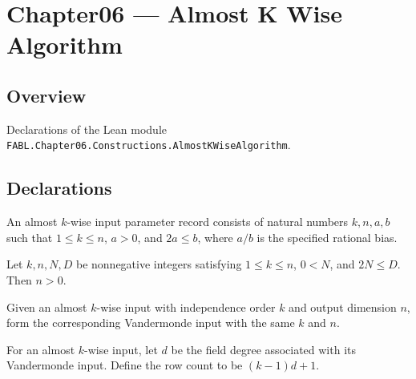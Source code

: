 \chapter{Chapter06 — Almost K Wise Algorithm}
\section{Overview}

Declarations of the Lean module \texttt{FABL.Chapter06.Constructions.AlmostKWiseAlgorithm}.

\section{Declarations}

\begin{definition}
\label{FABL.AlmostKWiseInput}
\leanok
An almost $k$-wise input parameter record consists of natural numbers $k,n,a,b$ such
that $1\le k\le n$, $a>0$, and $2a\le b$, where $a/b$ is the specified rational bias.
\end{definition}

\begin{theorem}
\label{FABL.AlmostKWiseInput.n_pos}
\leanok
{}
Let $k,n,N,D$ be nonnegative integers satisfying $1\le k\le n$, $0<N$, and $2N\le D$.
Then $n>0$.
\end{theorem}

\begin{definition}
\label{FABL.AlmostKWiseInput.vandermondeInput}
\leanok
{}
Given an almost $k$-wise input with independence order $k$ and output dimension $n$,
form the corresponding Vandermonde input with the same $k$ and $n$.
\end{definition}

\begin{definition}
\label{FABL.AlmostKWiseInput.rowCount}
\leanok
{}
For an almost $k$-wise input, let $d$ be the field degree associated with its
Vandermonde input. Define the row count to be $(k-1)d+1$.
\end{definition}

